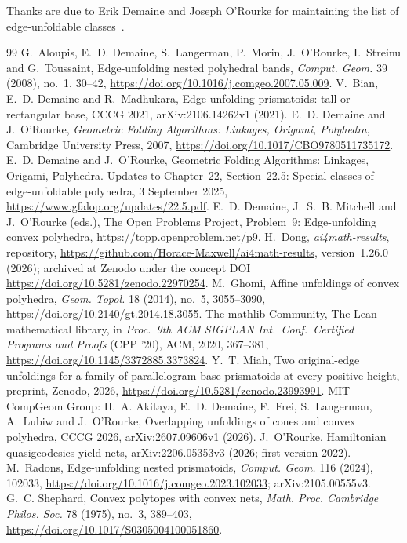 \documentclass[11pt]{article}
\theoremstyle{definition}
\theoremstyle{remark}
\newcommand{\repoversion}{1.26.0}
\begin{document}
\medskip
\noindent Thanks are due to Erik Demaine and Joseph O'Rourke for maintaining
the list of edge-unfoldable classes~\cite{do25}.

{\small
\begin{thebibliography}{99}
\setlength{\itemsep}{0pt}
 G.~Aloupis, E.~D. Demaine, S.~Langerman, P.~Morin,
J.~O'Rourke, I.~Streinu and G.~Toussaint, Edge-unfolding nested polyhedral
bands, \emph{Comput. Geom.} 39 (2008), no.~1, 30--42,
\url{https://doi.org/10.1016/j.comgeo.2007.05.009}.
 V.~Bian, E.~D. Demaine and R.~Madhukara, Edge-unfolding
prismatoids: tall or rectangular base, CCCG 2021, arXiv:2106.14262v1 (2021).
 E.~D. Demaine and J.~O'Rourke, \emph{Geometric Folding
Algorithms: Linkages, Origami, Polyhedra}, Cambridge University Press, 2007,
\url{https://doi.org/10.1017/CBO9780511735172}.
 E.~D. Demaine and J.~O'Rourke, Geometric Folding Algorithms:
Linkages, Origami, Polyhedra. Updates to Chapter~22, Section~22.5: Special
classes of edge-unfoldable polyhedra, 3 September 2025,
\url{https://www.gfalop.org/updates/22.5.pdf}.
 E.~D. Demaine, J.~S.~B. Mitchell and J.~O'Rourke (eds.), The Open
Problems Project, Problem~9: Edge-unfolding convex polyhedra,
\url{https://topp.openproblem.net/p9}.
 H.~Dong, \emph{ai4math-results}, repository,
\url{https://github.com/Horace-Maxwell/ai4math-results}, version~\repoversion{}
(2026); archived at Zenodo under the concept DOI
\url{https://doi.org/10.5281/zenodo.22970254}.
 M.~Ghomi, Affine unfoldings of convex polyhedra,
\emph{Geom. Topol.} 18 (2014), no.~5, 3055--3090,
\url{https://doi.org/10.2140/gt.2014.18.3055}.
The mathlib Community, The Lean mathematical library, in \emph{Proc.\ 9th ACM
SIGPLAN Int.\ Conf.\ Certified Programs and Proofs} (CPP '20), ACM, 2020,
367--381, \url{https://doi.org/10.1145/3372885.3373824}.
 Y.~T. Miah, Two original-edge unfoldings for a family of
parallelogram-base prismatoids at every positive height, preprint, Zenodo,
2026, \url{https://doi.org/10.5281/zenodo.23993991}.
 MIT CompGeom Group: H.~A. Akitaya, E.~D. Demaine, F.~Frei,
S.~Langerman, A.~Lubiw and J.~O'Rourke, Overlapping unfoldings of cones and
convex polyhedra, CCCG 2026, arXiv:2607.09606v1 (2026).
 J.~O'Rourke, Hamiltonian quasigeodesics yield nets,
arXiv:2206.05353v3 (2026; first version 2022).
 M.~Radons, Edge-unfolding nested prismatoids,
\emph{Comput. Geom.} 116 (2024), 102033,
\url{https://doi.org/10.1016/j.comgeo.2023.102033}; arXiv:2105.00555v3.
 G.~C. Shephard, Convex polytopes with convex nets,
\emph{Math. Proc. Cambridge Philos. Soc.} 78 (1975), no.~3, 389--403,
\url{https://doi.org/10.1017/S0305004100051860}.
\end{thebibliography}}
\end{document}
